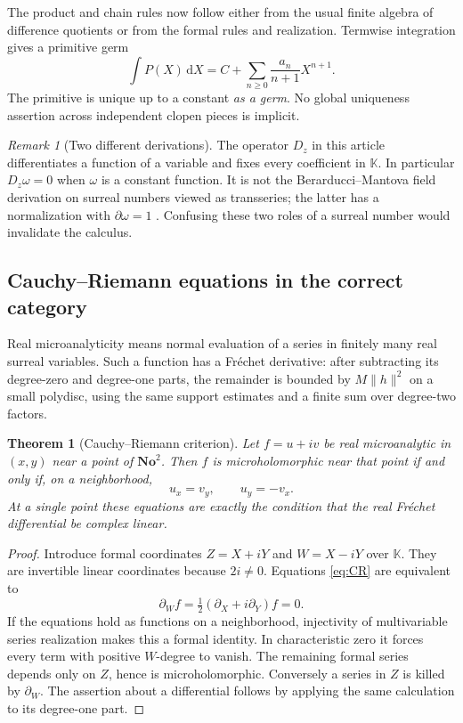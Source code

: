 \documentclass[11pt,letterpaper]{article}
\numberwithin{equation}{section}
\newtheorem{theorem}{Theorem}[section]
\theoremstyle{definition}
\theoremstyle{remark}
\newtheorem{remark}[remark]{Remark}
\newcommand{\No}{\mathbf{No}}
\newcommand{\K}{\mathbb K}
\newcommand{\dd}{\,\mathrm d}
\begin{document}
The product and chain rules now follow either from the usual finite
algebra of difference quotients or from the formal rules and realization.
Termwise integration gives a primitive germ
\[
 \int P(X)\dd X=C+\sum_{n\ge0}\frac{a_n}{n+1}X^{n+1}.
\]
The primitive is unique up to a constant \emph{as a germ}. No global
uniqueness assertion across independent clopen pieces is implicit.

\begin{remark}[Two different derivations]
The operator $D_z$ in this article differentiates a function of a variable
and fixes every coefficient in $\K$. In particular $D_z\omega=0$ when
$\omega$ is a constant function. It is not the Berarducci--Mantova field
derivation on surreal numbers viewed as transseries; the latter has a
normalization with $\partial\omega=1$ \cite{BMderivations}. Confusing these
two roles of a surreal number would invalidate the calculus.
\end{remark}

\subsection{Cauchy--Riemann equations in the correct category}

Real microanalyticity means normal evaluation of a series in finitely many
real surreal variables. Such a function has a Fr\'echet derivative: after
subtracting its degree-zero and degree-one parts, the remainder is bounded
by $M\|h\|^2$ on a small polydisc, using the same support estimates and a
finite sum over degree-two factors.

\begin{theorem}[Cauchy--Riemann criterion]\label{thm:CR}
Let $f=u+iv$ be real microanalytic in $(x,y)$ near a point of $\No^2$.
Then $f$ is microholomorphic near that point if and only if, on a
neighborhood,
\begin{equation}\label{eq:CR}
 u_x=v_y,\qquad u_y=-v_x.
\end{equation}
At a single point these equations are exactly the condition that the
real Fr\'echet differential be complex linear.
\end{theorem}
\begin{proof}
Introduce formal coordinates $Z=X+iY$ and $W=X-iY$ over $\K$.
They are invertible linear coordinates because $2i\ne0$. Equations
\eqref{eq:CR} are equivalent to
\[
 \partial_W f=\tfrac12(\partial_X+i\partial_Y)f=0.
\]
If the equations hold as functions on a neighborhood, injectivity of
multivariable series realization makes this a formal identity. In
characteristic zero it forces every term with positive $W$-degree to
vanish. The remaining formal series depends only on $Z$, hence is
microholomorphic. Conversely a series in $Z$ is killed by $\partial_W$.
The assertion about a differential follows by applying the same calculation
to its degree-one part.
\end{proof}
\end{document}
